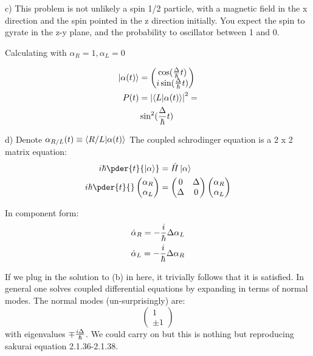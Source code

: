 \documentclass[10pt]{scrartcl}
\begin{document}
c) This problem is not unlikely a spin 1/2 particle, with a magnetic field in the x direction and the spin pointed in the z direction initially.  You expect the spin to gyrate in the z-y plane, and the probability to oscillator between 1 and 0.

Calculating with $\alpha_R = 1, \alpha_L = 0$

\begin{align}
	\ket{\alpha (t)} &= 
	\begin{pmatrix}
		 \cos({\Delta \over \hbar}t)\\
		i \sin({\Delta \over \hbar} t)
	\end{pmatrix}  \\
   P(t) & = \left| \braket{L| \alpha(t)} \right|^2 = \\
   & \sin^2({\Delta \over \hbar}t)
\end{align}

d) Denote $\alpha_{R/L}(t) \equiv \braket{ R/L | \alpha(t)}$
The coupled schrodinger equation is a 2 x 2 matrix equation:
\begin{align}
	i \hbar \pder{t}{\ket{\alpha}} & = \hat{H} \ket{\alpha} \\
	i \hbar \pder{t}{} \begin{pmatrix}
		\alpha_R \\
		\alpha_L
	\end{pmatrix} & = 
\begin{pmatrix}
	0  & \Delta \\
	\Delta & 0 
\end{pmatrix} 
\begin{pmatrix}
	\alpha_R \\
	\alpha_L
\end{pmatrix} 
	\end{align}

In component form:
\begin{align}
	\dot{\alpha}_R = - {i \over \hbar} \Delta \alpha_L \\
	\dot{\alpha}_L = - {i \over \hbar} \Delta \alpha_R 
	\end{align}

If we plug in the solution to (b) in here, it trivially follows that it is satisfied.  In general one solves coupled differential equations by expanding in terms of normal modes.  The normal modes (un-surprisingly) are:
\[\begin{pmatrix}
	1 \\
	\pm 1
\end{pmatrix} \]
with eigenvalues $\mp {i \Delta \over \hbar}$.  We could carry on but this is nothing but reproducing sakurai equation 2.1.36-2.1.38.




 






	
	
\end{document}
